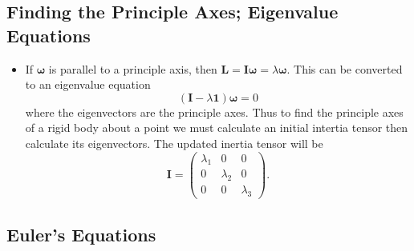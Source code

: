 \documentclass{article}
\renewcommand{\vec}[1]{\boldsymbol{\mathbf{#1}}}
\begin{document}
\subsection{Finding the Principle Axes; Eigenvalue Equations}

\begin{itemize}
  \item If $\vec{\omega}$ is parallel to a principle axis, then $\vec{L} = \vec{I} \vec{\omega} = \lambda \vec{\omega}$. This can be converted to an eigenvalue equation \[(\vec{I} - \lambda \vec{1}) \vec{\omega} = 0\] where the eigenvectors are the principle axes. Thus to find the principle axes of a rigid body about a point we must calculate an initial intertia tensor then calculate its eigenvectors. The updated inertia tensor will be \[\vec{I} = \begin{pmatrix}
            \lambda_1 & 0         & 0         \\
            0         & \lambda_2 & 0         \\
            0         & 0         & \lambda_3
          \end{pmatrix}.\]
\end{itemize}

\setcounter{subsection}{6}
\subsection{Euler's Equations}
\end{document}
